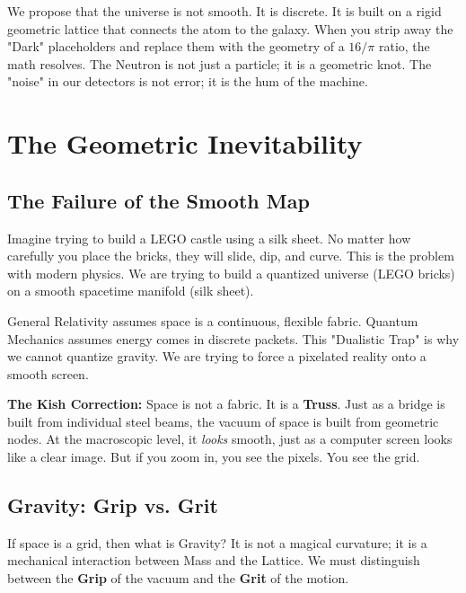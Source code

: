 \documentclass[11pt, letterpaper, openany]{book}
\begin{document}
We propose that the universe is not smooth. It is discrete. It is built on a rigid geometric lattice that connects the atom to the galaxy. When you strip away the "Dark" placeholders and replace them with the geometry of a $16/\pi$ ratio, the math resolves. The Neutron is not just a particle; it is a geometric knot. The "noise" in our detectors is not error; it is the hum of the machine.

\tableofcontents


\chapter{The Geometric Inevitability}
\label{chap:inevitability}

\section{The Failure of the Smooth Map}
Imagine trying to build a LEGO castle using a silk sheet. No matter how carefully you place the bricks, they will slide, dip, and curve. This is the problem with modern physics. We are trying to build a quantized universe (LEGO bricks) on a smooth spacetime manifold (silk sheet).

General Relativity assumes space is a continuous, flexible fabric. Quantum Mechanics assumes energy comes in discrete packets. This "Dualistic Trap" is why we cannot quantize gravity. We are trying to force a pixelated reality onto a smooth screen.

\textbf{The Kish Correction:} Space is not a fabric. It is a \textbf{Truss}.
Just as a bridge is built from individual steel beams, the vacuum of space is built from geometric nodes. At the macroscopic level, it \textit{looks} smooth, just as a computer screen looks like a clear image. But if you zoom in, you see the pixels. You see the grid.

\section{Gravity: Grip vs. Grit}
If space is a grid, then what is Gravity? It is not a magical curvature; it is a mechanical interaction between Mass and the Lattice. We must distinguish between the \textbf{Grip} of the vacuum and the \textbf{Grit} of the motion.
\end{document}
